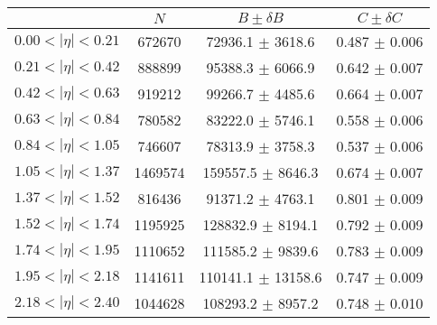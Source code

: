 \begin{tabular}{lccc}
\hline
    &   $N$   & $B \pm \delta B$  &  $C \pm \delta C$ \\
\hline
$0.00 < |\eta| <0.21$          & 672670     & 72936.1    $\pm$ 3618.6 & 0.487      $\pm$ 0.006 \\
$0.21 < |\eta| <0.42$          & 888899     & 95388.3    $\pm$ 6066.9 & 0.642      $\pm$ 0.007 \\
$0.42 < |\eta| <0.63$          & 919212     & 99266.7    $\pm$ 4485.6 & 0.664      $\pm$ 0.007 \\
$0.63 < |\eta| <0.84$          & 780582     & 83222.0    $\pm$ 5746.1 & 0.558      $\pm$ 0.006 \\
$0.84 < |\eta| <1.05$          & 746607     & 78313.9    $\pm$ 3758.3 & 0.537      $\pm$ 0.006 \\
$1.05 < |\eta| <1.37$          & 1469574    & 159557.5   $\pm$ 8646.3 & 0.674      $\pm$ 0.007 \\
$1.37 < |\eta| <1.52$          & 816436     & 91371.2    $\pm$ 4763.1 & 0.801      $\pm$ 0.009 \\
$1.52 < |\eta| <1.74$          & 1195925    & 128832.9   $\pm$ 8194.1 & 0.792      $\pm$ 0.009 \\
$1.74 < |\eta| <1.95$          & 1110652    & 111585.2   $\pm$ 9839.6 & 0.783      $\pm$ 0.009 \\
$1.95 < |\eta| <2.18$          & 1141611    & 110141.1   $\pm$ 13158.6 & 0.747      $\pm$ 0.009 \\
$2.18 < |\eta| <2.40$          & 1044628    & 108293.2   $\pm$ 8957.2 & 0.748      $\pm$ 0.010 \\
\hline
\end{tabular}
